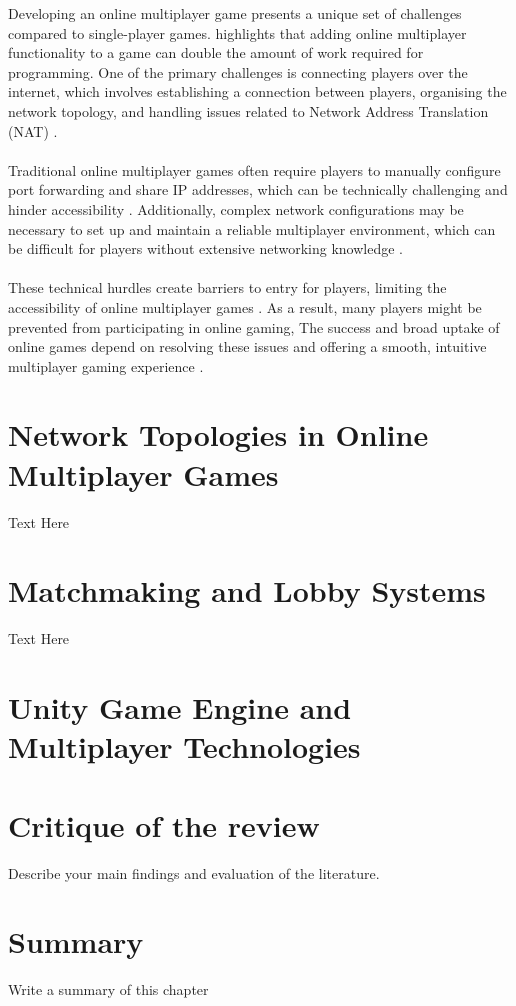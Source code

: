 Developing an online multiplayer game presents a unique set of challenges compared to single-player games. \cite{adding-mutliplayer} highlights that adding online multiplayer functionality to a game can double the amount of work required for programming. One of the primary challenges is connecting players over the internet, which involves establishing a connection between players, organising the network topology, and handling issues related to Network Address Translation (NAT) \cite{network-architecting}.
\\
\noindent
\\
Traditional online multiplayer games often require players to manually configure port forwarding and share IP addresses, which can be technically challenging and hinder accessibility \cite{network-architecting}. Additionally, complex network configurations may be necessary to set up and maintain a reliable multiplayer environment, which can be difficult for players without extensive networking knowledge \cite{develop-unity}.
\\
\noindent
\\
These technical hurdles create barriers to entry for players, limiting the accessibility of online multiplayer games \cite{port-forwarding}. As a result, many players might be prevented from participating in online gaming, The success and broad uptake of online games depend on resolving these issues and offering a smooth, intuitive multiplayer gaming experience \cite{multiplayer-networking}.
\section{Network Topologies in Online Multiplayer Games }

Text Here

\section{Matchmaking and Lobby Systems}

Text Here

\section{Unity Game Engine and Multiplayer Technologies}

\section{Critique of the review} %
Describe your main findings and evaluation of the literature. ~\\

\section{Summary} 
Write a summary of this chapter~\\
